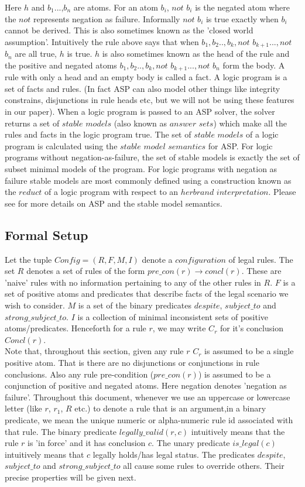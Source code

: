 Here $h$ and $b_{1}$...,$b_{n}$ are atoms. For an atom $b_{i}$, $not$ $b_{i}$ is the negated atom where the $not$ represents negation as failure. Informally $not$ $b_{i}$ is true exactly when $b_{i}$ cannot be derived. This is also sometimes known as the 'closed world assumption'. Intuitively the rule above says that when $b_{1},b_{2}..,b_{k},not$ $b_{k+1}...,not$ $b_{n}$ are all true, $h$ is true. $h$ is also sometimes known as the head of the rule and the positive and negated atoms $b_{1},b_{2}..,b_{k},not$ $b_{k+1}...,not$ $b_{n}$ form the body. A rule with only a head and an empty body is called a fact. A logic program is a set of facts and rules. (In fact ASP can also model other things like integrity constrains, disjunctions in rule heads etc, but we will not be using these features in our paper). When a logic program is passed to an ASP solver, the solver returns a set of $stable$ $models$ (also known as $answer$ $sets$) which make all the rules and facts in the logic program true. The set of $stable$ $models$ of a logic program is calculated using the $stable$ $model$ $semantics$ for ASP. For logic programs without negation-as-failure, the set of stable models is exactly the set of subset minimal models of the program. For logic programs with negation as failure stable models are most commonly defined using a construction known as the $reduct$ of a logic program with respect to an $herbrand$ $interpretation$. Please see \cite{asp_background} for more details on ASP and the stable model semantics.    
\subsection{Formal Setup}
Let the tuple $Config = (R,F,M,I)$ denote a $configuration$ of legal rules. The set $R$ denotes a set of rules of the form $pre\_con(r)\rightarrow concl(r)$. These are 'naive' rules with no information pertaining to any of the other rules in $R$. $F$ is a set of positive atoms and predicates that describe facts of the legal scenario we wish to consider. $M$ is a set of the binary predicates $despite$, $subject\_to$ and $strong\_subject\_to$. $I$ is a collection of minimal inconsistent sets of positive atoms/predicates. Henceforth for a rule $r$, we may write $C_{r}$ for it's conclusion $Concl(r)$.\\ Note that, throughout this section, given any rule $r$ $C_{r}$ is assumed to be a single positive atom. That is there are no disjunctions or conjunctions in rule conclusions. Also any rule pre-condition ($pre\_con(r)$) is assumed to be a conjunction of positive and negated atoms. Here negation denotes 'negation as failure'.  
\newline
Throughout this document, whenever we use an uppercase or lowercase letter (like $r$, $r_{1}$, $R$ etc.) to denote a rule that is an argument,in a binary predicate, we mean the unique numeric or alpha-numeric rule id associated with that rule. The binary predicate $legally\_valid(r,c)$ intuitively means that the rule $r$ is 'in force' and it has conclusion $c$. The unary predicate $is\_legal(c)$ intuitively means that $c$ legally holds/has legal status. The predicates $despite$, $subject\_to$ and $strong\_subject\_to$ all cause some rules to override others. Their precise properties will be given next.
